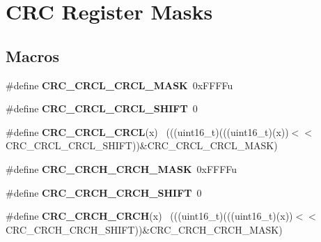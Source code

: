 \hypertarget{group___c_r_c___register___masks}{}\section{C\+R\+C Register Masks}
\label{group___c_r_c___register___masks}
\subsection*{Macros}
\begin{DoxyCompactItemize}
\item 
\hypertarget{group___c_r_c___register___masks_ga41565ef941db78c9470646b7246e78a1}{}\#define {\bfseries C\+R\+C\+\_\+\+C\+R\+C\+L\+\_\+\+C\+R\+C\+L\+\_\+\+M\+A\+S\+K}~0x\+F\+F\+F\+Fu\label{group___c_r_c___register___masks_ga41565ef941db78c9470646b7246e78a1}

\item 
\hypertarget{group___c_r_c___register___masks_ga0b4ef9a44a372a3fc83d3a414a4a976b}{}\#define {\bfseries C\+R\+C\+\_\+\+C\+R\+C\+L\+\_\+\+C\+R\+C\+L\+\_\+\+S\+H\+I\+F\+T}~0\label{group___c_r_c___register___masks_ga0b4ef9a44a372a3fc83d3a414a4a976b}

\item 
\hypertarget{group___c_r_c___register___masks_gaddadfc7b1b0cc564ed86759d201f8a5d}{}\#define {\bfseries C\+R\+C\+\_\+\+C\+R\+C\+L\+\_\+\+C\+R\+C\+L}(x)                                              ~(((uint16\+\_\+t)(((uint16\+\_\+t)(x))$<$$<$C\+R\+C\+\_\+\+C\+R\+C\+L\+\_\+\+C\+R\+C\+L\+\_\+\+S\+H\+I\+F\+T))\&C\+R\+C\+\_\+\+C\+R\+C\+L\+\_\+\+C\+R\+C\+L\+\_\+\+M\+A\+S\+K)\label{group___c_r_c___register___masks_gaddadfc7b1b0cc564ed86759d201f8a5d}

\item 
\hypertarget{group___c_r_c___register___masks_ga0d262484bee068f2b06d17d24447bec7}{}\#define {\bfseries C\+R\+C\+\_\+\+C\+R\+C\+H\+\_\+\+C\+R\+C\+H\+\_\+\+M\+A\+S\+K}~0x\+F\+F\+F\+Fu\label{group___c_r_c___register___masks_ga0d262484bee068f2b06d17d24447bec7}

\item 
\hypertarget{group___c_r_c___register___masks_ga622add8b361a806791891fb0dd4c397e}{}\#define {\bfseries C\+R\+C\+\_\+\+C\+R\+C\+H\+\_\+\+C\+R\+C\+H\+\_\+\+S\+H\+I\+F\+T}~0\label{group___c_r_c___register___masks_ga622add8b361a806791891fb0dd4c397e}

\item 
\hypertarget{group___c_r_c___register___masks_gac12c9fe0b28e83b002ce28b93c70f538}{}\#define {\bfseries C\+R\+C\+\_\+\+C\+R\+C\+H\+\_\+\+C\+R\+C\+H}(x)                                              ~(((uint16\+\_\+t)(((uint16\+\_\+t)(x))$<$$<$C\+R\+C\+\_\+\+C\+R\+C\+H\+\_\+\+C\+R\+C\+H\+\_\+\+S\+H\+I\+F\+T))\&C\+R\+C\+\_\+\+C\+R\+C\+H\+\_\+\+C\+R\+C\+H\+\_\+\+M\+A\+S\+K)\label{group___c_r_c___register___masks_gac12c9fe0b28e83b002ce28b93c70f538}


\end{DoxyCompactItemize}
